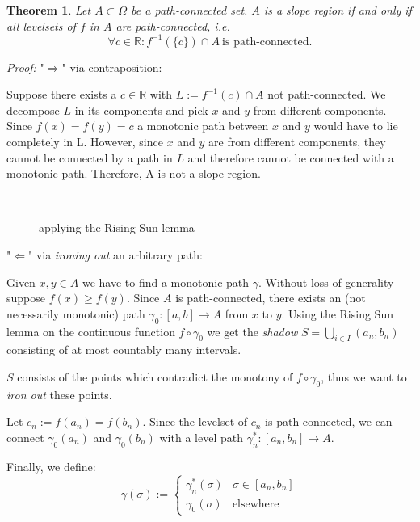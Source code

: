 \documentclass[11pt,twoside,twocolumn,a4paper]{article}
\theoremstyle{plain}
\newtheorem{thm}{Theorem}[section] %
\theoremstyle{definition}
\begin{document}
\begin{thm}
\label{slope_iff_conn_lvlsets}
Let $A \subset \Omega$ be a path-connected set.
$A$ is a slope region if and only if all levelsets of $f$ in $A$ are path-connected, i.e.
\begin{equation*}
\forall c \in \mathbb{R}: f^{-1}(\{c\}) \cap A ~ \text{is path-connected}.
\end{equation*}
\end{thm}

\emph{Proof:} "$\Rightarrow$" via contraposition:

Suppose there exists a $c \in \mathbb{R}$ with $L := f^{-1}(c) \cap A$ not path-connected.
We decompose $L$ in its components and pick $x$ and $y$ from different components.
Since $f(x) = f(y) = c$ a monotonic path between $x$ and $y$ would have to lie completely in L.
However, since $x$ and $y$ are from different components, they cannot be connected by a path in $L$ and therefore cannot be connected with a monotonic path.
Therefore, A is not a slope region.

$~$

\begin{figure}
\centering
\def\svgwidth{0.4\textwidth}

\caption{applying the Rising Sun lemma}
\label{fig:lemma_1}
\end{figure}

"$\Leftarrow$" via \emph{ironing out} an arbitrary path:

Given $x, y \in A$ we have to find a monotonic path $\gamma$.
Without loss of generality suppose $f(x) \geq f(y)$.
Since $A$ is path-connected, there exists an (not necessarily monotonic) path $\gamma_0: [a,b] \to A$ from $x$ to $y$.
Using the Rising Sun lemma \cite{riesz1932theoreme} on the continuous function $f \circ \gamma_0$ we get the \emph{shadow} $S = \bigcup_{i \in I} (a_n, b_n)$ consisting of at most countably many intervals.

$S$ consists of the points which contradict the monotony of $f \circ \gamma_0$, thus we want to \emph{iron out} these points.

Let $c_n := f(a_n) = f(b_n)$. Since the levelset of $c_n$ is path-connected, we can connect $\gamma_0(a_n)$ and $\gamma_0(b_n)$ with a level path $\gamma_n^* : [a_n, b_n] \to A.$

Finally, we define:
\begin{equation*}
\gamma(\sigma) :=
\begin{cases}
\gamma_n^*(\sigma) & \sigma \in [a_n, b_n] \\
\gamma_0(\sigma) & \text{elsewhere}
\end{cases}
\end{equation*}
\end{document}
